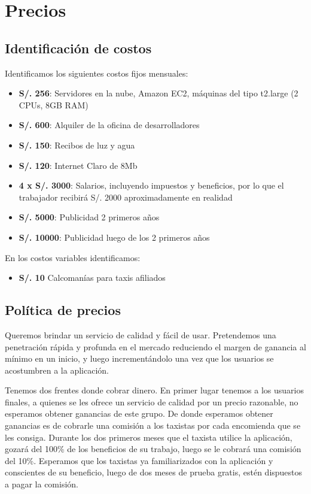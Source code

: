 \section{Precios}

\subsection{Identificación de costos}
\label{sec:costos}
Identificamos los siguientes costos fijos mensuales:

\begin{itemize}
\item \textbf{S/. 256}: Servidores en la nube, Amazon EC2, máquinas del tipo t2.large (2 CPUs, 8GB RAM)
\item \textbf{S/. 600}: Alquiler de la oficina de desarrolladores
\item \textbf{S/. 150}: Recibos de luz y agua
\item \textbf{S/. 120}: Internet Claro de 8Mb
\item \textbf{4 x S/. 3000}: Salarios, incluyendo impuestos y beneficios, por lo que el trabajador recibirá S/. 2000 aproximadamente en realidad
\item \textbf{S/. 5000}: Publicidad 2 primeros años
\item \textbf{S/. 10000}: Publicidad luego de los 2 primeros años
\end{itemize}

En los costos variables identificamos:
\begin{itemize}
\item \textbf{S/. 10} Calcomanías para taxis afiliados
\end{itemize}

\subsection{Política de precios}

Queremos brindar un servicio de calidad y fácil de usar. Pretendemos una penetración rápida y profunda en el mercado reduciendo el margen de ganancia al mínimo en un inicio, y luego incrementándolo una vez que los usuarios se acostumbren a la aplicación.

Tenemos dos frentes donde cobrar dinero. En primer lugar tenemos a los usuarios finales, a quienes se les ofrece un servicio de calidad por un precio razonable, no esperamos obtener ganancias de este grupo. De donde esperamos obtener ganancias es de cobrarle una comisión a los taxistas por cada encomienda que se les consiga. Durante los dos primeros meses que el taxista utilice la aplicación, gozará del 100\% de los beneficios de su trabajo, luego se le cobrará una comisión del 10\%. Esperamos que los taxistas ya familiarizados con la aplicación y conscientes de su beneficio, luego de dos meses de prueba gratis, estén dispuestos a pagar la comisión.


